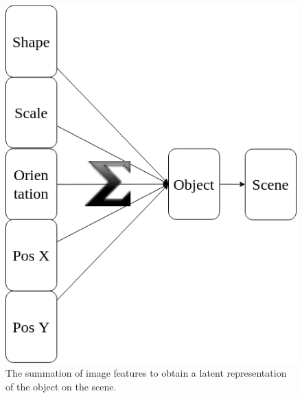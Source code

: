 \documentclass{article}
\begin{document}
    \begin{figure}[ht]
        \begin{minipage}[t]{0.48\textwidth}
            \centering
            \includegraphics[width=\textwidth]{img/model/sum_features_to_scene}
            \caption{The summation of image features to obtain a latent representation of the object on the scene.}
            \label{fig:sum_features_to_scene}
        \end{minipage}\hfill
        \begin{minipage}[t]{0.48\textwidth}
            \centering

\end{minipage}
\end{figure}
\end{document}

